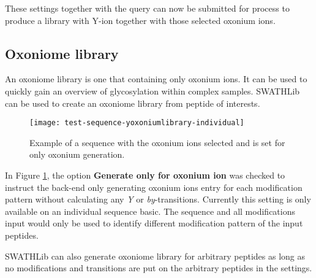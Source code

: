 \documentclass[../manual.tex]{subfiles}
\begin{document}
These settings together with the query can now be submitted for process to produce a library with Y-ion together with those selected oxonium ions.\par

\subsection{Oxoniome library}
An oxoniome library is one that containing only oxonium ions. It can be used to quickly gain an overview of glycosylation within complex samples. SWATHLib can be used to create an oxoniome library from peptide of interests. 

\begin{figure}[H]
	\centering
	\begin{framed}
        \centering
        \begin{adjustbox}{width=1\textwidth}
			\texttt{[image: test-sequence-yoxoniumlibrary-individual]}
		\end{adjustbox}
		\caption{Example of a sequence with the oxonium ions selected and is set for only oxonium generation.}\label{fig:testsequenceyoxoniumlibraryindividual}
	\end{framed}
\end{figure}

In Figure \ref{fig:testsequenceyoxoniumlibraryindividual}, the option \textbf{Generate only for oxonium ion} was checked to instruct the back-end only generating oxonium ions entry for each modification pattern without calculating any \emph{Y} or \emph{by}-transitions. Currently this setting is only available on an individual sequence basic. The sequence and all modifications input would only be used to identify different modification pattern of the input peptides.\par

SWATHLib can also generate oxoniome library for arbitrary peptides as long as no modifications and transitions are put on the arbitrary peptides in the settings.\par
\end{document}
